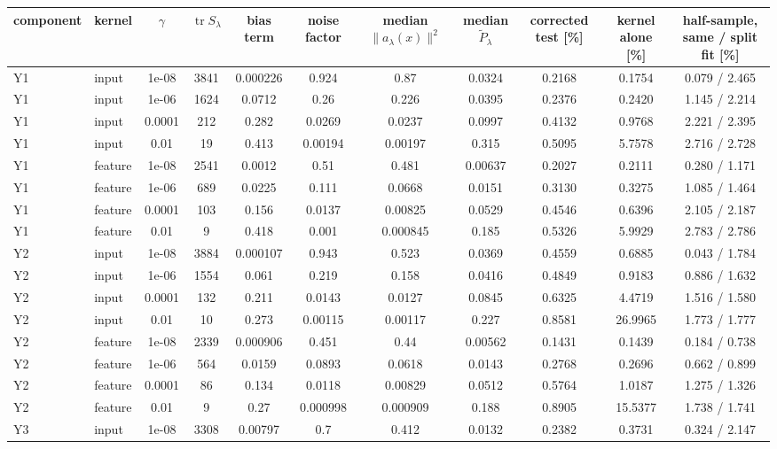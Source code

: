 \begin{tabular}{llccccccccc}
\toprule
component & kernel & $\gamma$ & $\operatorname{tr}S_\lambda$ & bias term & noise factor & median $\|a_\lambda(x)\|^2$ & median $\widetilde P_\lambda$ & corrected test [\%] & kernel alone [\%] & half-sample, same / split fit [\%] \\
\midrule
Y1 & input & 1e-08 & 3841 & 0.000226 & 0.924 & 0.87 & 0.0324 & 0.2168 & 0.1754 & 0.079 / 2.465 \\
Y1 & input & 1e-06 & 1624 & 0.0712 & 0.26 & 0.226 & 0.0395 & 0.2376 & 0.2420 & 1.145 / 2.214 \\
Y1 & input & 0.0001 & 212 & 0.282 & 0.0269 & 0.0237 & 0.0997 & 0.4132 & 0.9768 & 2.221 / 2.395 \\
Y1 & input & 0.01 & 19 & 0.413 & 0.00194 & 0.00197 & 0.315 & 0.5095 & 5.7578 & 2.716 / 2.728 \\
Y1 & feature & 1e-08 & 2541 & 0.0012 & 0.51 & 0.481 & 0.00637 & 0.2027 & 0.2111 & 0.280 / 1.171 \\
Y1 & feature & 1e-06 & 689 & 0.0225 & 0.111 & 0.0668 & 0.0151 & 0.3130 & 0.3275 & 1.085 / 1.464 \\
Y1 & feature & 0.0001 & 103 & 0.156 & 0.0137 & 0.00825 & 0.0529 & 0.4546 & 0.6396 & 2.105 / 2.187 \\
Y1 & feature & 0.01 & 9 & 0.418 & 0.001 & 0.000845 & 0.185 & 0.5326 & 5.9929 & 2.783 / 2.786 \\
Y2 & input & 1e-08 & 3884 & 0.000107 & 0.943 & 0.523 & 0.0369 & 0.4559 & 0.6885 & 0.043 / 1.784 \\
Y2 & input & 1e-06 & 1554 & 0.061 & 0.219 & 0.158 & 0.0416 & 0.4849 & 0.9183 & 0.886 / 1.632 \\
Y2 & input & 0.0001 & 132 & 0.211 & 0.0143 & 0.0127 & 0.0845 & 0.6325 & 4.4719 & 1.516 / 1.580 \\
Y2 & input & 0.01 & 10 & 0.273 & 0.00115 & 0.00117 & 0.227 & 0.8581 & 26.9965 & 1.773 / 1.777 \\
Y2 & feature & 1e-08 & 2339 & 0.000906 & 0.451 & 0.44 & 0.00562 & 0.1431 & 0.1439 & 0.184 / 0.738 \\
Y2 & feature & 1e-06 & 564 & 0.0159 & 0.0893 & 0.0618 & 0.0143 & 0.2768 & 0.2696 & 0.662 / 0.899 \\
Y2 & feature & 0.0001 & 86 & 0.134 & 0.0118 & 0.00829 & 0.0512 & 0.5764 & 1.0187 & 1.275 / 1.326 \\
Y2 & feature & 0.01 & 9 & 0.27 & 0.000998 & 0.000909 & 0.188 & 0.8905 & 15.5377 & 1.738 / 1.741 \\
Y3 & input & 1e-08 & 3308 & 0.00797 & 0.7 & 0.412 & 0.0132 & 0.2382 & 0.3731 & 0.324 / 2.147 \\

\end{tabular}
